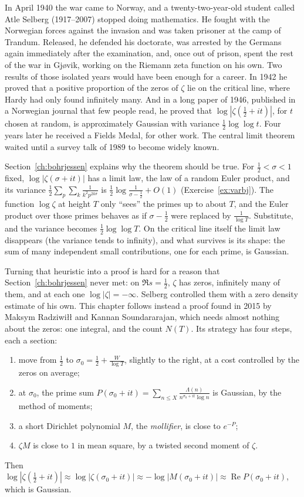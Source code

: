 In April 1940 the war came to Norway, and a twenty-two-year-old student called Atle Selberg (1917--2007) stopped doing mathematics. He fought with the Norwegian forces against the invasion and was taken prisoner at the camp of Trandum. Released, he defended his doctorate, was arrested by the Germans again immediately after the examination, and, once out of prison, spent the rest of the war in Gj\o{}vik, working on the Riemann zeta function on his own. Two results of those isolated years would have been enough for a career. In 1942 he proved that a positive proportion of the zeros of $\zeta$ lie on the critical line, where Hardy had only found infinitely many. And in a long paper of 1946, published in a Norwegian journal that few people read, he proved that $\log|\zeta(\frac12+it)|$, for $t$ chosen at random, is approximately Gaussian with variance $\frac12\log\log t$. Four years later he received a Fields Medal, for other work. The central limit theorem waited until a survey talk of 1989 to become widely known.

Section~\ref{ch:bohrjessen} explains why the theorem should be true. For $\frac12<\sigma<1$ fixed, $\log|\zeta(\sigma+it)|$ has a limit law, the law of a random Euler product, and its variance $\frac12\sum_p\sum_k\frac1{k^2p^{2k\sigma}}$ is $\frac12\log\frac1{\sigma-\frac12}+O(1)$ (Exercise~\ref{ex:varbj}). The function $\log\zeta$ at height $T$ only ``sees'' the primes up to about $T$, and the Euler product over those primes behaves as if $\sigma-\frac12$ were replaced by $\frac1{\log T}$. Substitute, and the variance becomes $\frac12\log\log T$. On the critical line itself the limit law disappears (the variance tends to infinity), and what survives is its shape: the sum of many independent small contributions, one for each prime, is Gaussian.

Turning that heuristic into a proof is hard for a reason that Section~\ref{ch:bohrjessen} never met: on $\Re s=\frac12$, $\zeta$ has zeros, infinitely many of them, and at each one $\log|\zeta|=-\infty$. Selberg controlled them with a zero density estimate of his own. This chapter follows instead a proof found in 2015 by Maksym Radziwi\l\l{} and Kannan Soundararajan, which needs almost nothing about the zeros: one integral, and the count $N(T)$. Its strategy has four steps, each a section:
\begin{enumerate}
\item move from $\frac12$ to $\sigma_0=\frac12+\frac W{\log T}$, slightly to the right, at a cost controlled by the zeros on average;
\item at $\sigma_0$, the prime sum $P(\sigma_0+it)=\sum_{n\le X}\frac{\Lambda(n)}{n^{\sigma_0+it}\log n}$ is Gaussian, by the method of moments;
\item a short Dirichlet polynomial $M$, the \emph{mollifier}, is close to $e^{-P}$;
\item $\zeta M$ is close to $1$ in mean square, by a twisted second moment of $\zeta$.
\end{enumerate}
Then $\log|\zeta(\frac12+it)|\approx\log|\zeta(\sigma_0+it)|\approx-\log|M(\sigma_0+it)|\approx\operatorname{Re}P(\sigma_0+it)$, which is Gaussian.

